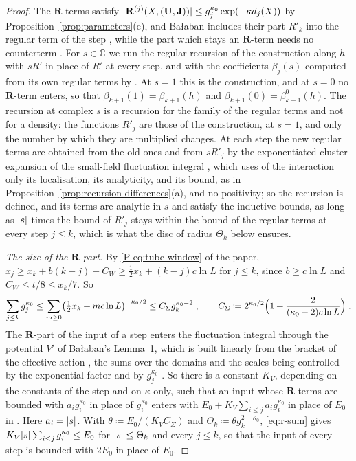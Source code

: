\documentclass[11pt]{preprint}
\DeclarePairedDelimiter{\abs}{\lvert}{\rvert}
\numberwithin{equation}{section}
\theoremstyle{definition}
\theoremstyle{remark}
\theoremstyle{plain}
\begin{document}
\begin{proof}
The $\mathbf R$-terms satisfy $\abs{\mathbf R^{(j)}(X, (\mathbf U, \mathbf J))} \leq g_j^{\kappa_0}\exp(-\kappa d_j(X))$ by Proposition~\ref{prop:parameters}(e), and Ba{\l}aban includes their part $R'_k$ into the regular term of the step \cite[p.~271]{BalabanCRE}, while the part which stays an $\mathbf R$-term needs no counterterm \cite[pp.~260, 276]{BalabanCRE}. For $s \in \mathbb C$ we run the regular recursion of the construction along $h$ with $sR'$ in place of $R'$ at every step, and with the coefficients $\beta_j(s)$ computed from its own regular terms by \cite[(3.57), (3.61), pp.~281--282]{BalabanCRE}. At $s = 1$ this is the construction, and at $s = 0$ no $\mathbf R$-term enters, so that $\beta_{k+1}(1) = \beta_{k+1}(h)$ and $\beta_{k+1}(0) = \beta^0_{k+1}(h)$. The recursion at complex $s$ is a recursion for the family of the regular terms and not for a density: the functions $R'_j$ are those of the construction, at $s = 1$, and only the number by which they are multiplied changes. At each step the new regular terms are obtained from the old ones and from $sR'_j$ by the exponentiated cluster expansion of the small-field fluctuation integral \cite[(3.26)--(3.47), pp.~271--278]{BalabanCRE}, which uses of the interaction only its localisation, its analyticity, and its bound, as in Proposition~\ref{prop:recursion-differences}(a), and no positivity; so the recursion is defined, and its terms are analytic in $s$ and satisfy the inductive bounds, as long as $\abs s$ times the bound of $R'_j$ stays within the bound of the regular terms at every step $j \leq k$, which is what the disc of radius $\Theta_k$ below ensures.

\emph{The size of the $\mathbf R$-part.} By \eqref{P-eq:tube-window} of the paper, $x_j \geq x_k + b(k - j) - C_W \geq \frac12x_k + (k - j)c\ln L$ for $j \leq k$, since $b \geq c\ln L$ and $C_W \leq t/8 \leq x_k/7$. So
\begin{equation}\label{eq:r-sum}
    \sum_{j \leq k}g_j^{\kappa_0} \leq \sum_{m \geq 0}\bigl(\tfrac12x_k + mc\ln L\bigr)^{-\kappa_0/2} \leq C_\Sigma g_k^{\kappa_0-2}\;,
    \qquad
    C_\Sigma \coloneqq 2^{\kappa_0/2}\Bigl(1 + \frac{2}{(\kappa_0 - 2)c\ln L}\Bigr)\;.
\end{equation}
The $\mathbf R$-part of the input of a step enters the fluctuation integral through the potential $V'$ of Ba{\l}aban's Lemma~1, which is built linearly from the bracket of the effective action \cite[(1.33)]{BalabanRG2}, the sums over the domains and the scales being controlled by the exponential factor and by $g_j^{\kappa_0}$ \cite[p.~260]{BalabanCRE}. So there is a constant $K_V$, depending on the constants of the step and on $\kappa$ only, such that an input whose $\mathbf R$-terms are bounded with $a_ig_i^{\kappa_0}$ in place of $g_i^{\kappa_0}$ enters with $E_0 + K_V\sum_{i \leq j}a_ig_i^{\kappa_0}$ in place of $E_0$ in \cite[(1.36), p.~9]{BalabanRG2}. Here $a_i = \abs{s}$. With $\theta \coloneqq E_0/(K_VC_\Sigma)$ and $\Theta_k \coloneqq \theta g_k^{2-\kappa_0}$, \eqref{eq:r-sum} gives $K_V\abs{s}\sum_{i \leq j}g_i^{\kappa_0} \leq E_0$ for $\abs{s} \leq \Theta_k$ and every $j \leq k$, so that the input of every step is bounded with $2E_0$ in place of $E_0$.


\end{proof}
\end{document}
